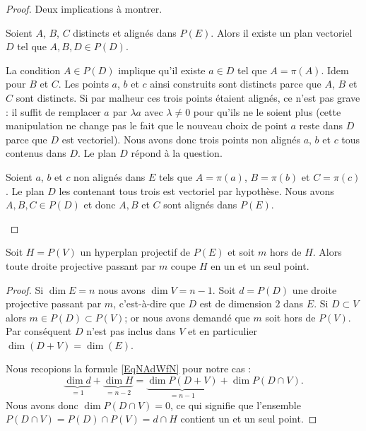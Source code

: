 \begin{proof}
	Deux implications à montrer.
	\begin{subproof}
		Soient \( A\), \( B\), \( C\) distincts et alignés dans \( P(E)\). Alors il existe un plan vectoriel \( D\) tel que \( A,B,D\in P(D)\).

		La condition \( A\in P(D)\) implique qu'il existe \( a\in D\) tel que \( A=\pi(A)\). Idem pour \( B\) et \( C\). Les points \( a\), \( b\) et \( c\) ainsi construits sont distincts parce que \( A\), \( B\) et \( C\) sont distincts. Si par malheur ces trois points étaient alignés, ce n'est pas grave : il suffit de remplacer \( a\) par \( \lambda a\) avec \( \lambda\neq 0\) pour qu'ils ne le soient plus (cette manipulation ne change pas le fait que le nouveau choix de point \( a\) reste dans \( D\) parce que \( D\) est vectoriel). Nous avons donc trois points non alignés \( a\), \( b\) et \( c\) tous contenus dans \( D\). Le plan \( D\) répond à la question.


		Soient \( a\), \( b\) et \( c\) non alignés dans \( E\) tels que \( A=\pi(a)\), \( B=\pi(b)\) et \( C=\pi(c)\). Le plan \( D\) les contenant tous trois est vectoriel par hypothèse. Nous avons \( A,B,C\in P(D)\) et donc \( A,B\) et \( C\) sont alignés dans \( P(E)\).
	\end{subproof}
\end{proof}

\begin{proposition}
	Soit \( H=P(V)\) un hyperplan projectif de \( P(E)\) et soit \( m\) hors de \( H\). Alors toute droite projective passant par \( m\) coupe \( H\) en un et un seul point.
\end{proposition}

\begin{proof}
	Si \( \dim E=n\) nous avons \( \dim V=n-1\). Soit \( d=P(D)\) une droite projective passant par \( m\), c'est-à-dire que \( D\) est de dimension \( 2\) dans \( E\). Si \( D\subset V\) alors \( m\in P(D)\subset P(V)\); or nous avons demandé que \( m\) soit hors de \( P(V)\). Par conséquent \( D\) n'est pas inclus dans \( V\) et en particulier \( \dim(D+V)=\dim(E)\).

	Nous recopions la formule \eqref{EqNAdWfN} pour notre cas :
	\begin{equation}
		\underbrace{\dim d}_{=1}+\underbrace{\dim H}_{=n-2}=\underbrace{\dim P(D+V)}_{=n-1}+\dim P(D\cap V).
	\end{equation}
	Nous avons donc \( \dim P(D\cap V)=0\), ce qui signifie que l'ensemble \( P(D\cap V)=P(D)\cap P(V)=d\cap H\) contient un et un seul point.
\end{proof}

